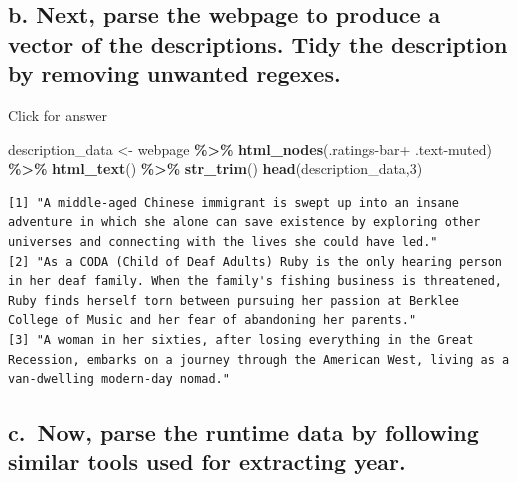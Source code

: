 \documentclass[
]{book}
\newenvironment{Shaded}{\begin{snugshade}}{\end{snugshade}}
\newcommand{\DecValTok}[1]{\textcolor[rgb]{0.00,0.00,0.81}{#1}}
\newcommand{\FunctionTok}[1]{\textcolor[rgb]{0.13,0.29,0.53}{\textbf{#1}}}
\newcommand{\NormalTok}[1]{#1}
\newcommand{\OtherTok}[1]{\textcolor[rgb]{0.56,0.35,0.01}{#1}}
\newcommand{\SpecialCharTok}[1]{\textcolor[rgb]{0.81,0.36,0.00}{\textbf{#1}}}
\newcommand{\StringTok}[1]{\textcolor[rgb]{0.31,0.60,0.02}{#1}}
\begin{document}
\hypertarget{b.-next-parse-the-webpage-to-produce-a-vector-of-the-descriptions.-tidy-the-description-by-removing-unwanted-regexes.}{%
\subsection{b. Next, parse the webpage to produce a vector of the descriptions. Tidy the description by removing unwanted regexes.}\label{b.-next-parse-the-webpage-to-produce-a-vector-of-the-descriptions.-tidy-the-description-by-removing-unwanted-regexes.}}

Click for answer

\begin{Shaded}
\begin{Highlighting}[]
\NormalTok{description\_data }\OtherTok{\textless{}{-}}\NormalTok{ webpage }\SpecialCharTok{\%\textgreater{}\%} 
  \FunctionTok{html\_nodes}\NormalTok{(}\StringTok{\textquotesingle{}.ratings{-}bar+ .text{-}muted\textquotesingle{}}\NormalTok{) }\SpecialCharTok{\%\textgreater{}\%} 
  \FunctionTok{html\_text}\NormalTok{() }\SpecialCharTok{\%\textgreater{}\%} 
  \FunctionTok{str\_trim}\NormalTok{()}
\FunctionTok{head}\NormalTok{(description\_data,}\DecValTok{3}\NormalTok{)}
\end{Highlighting}
\end{Shaded}

\begin{verbatim}
[1] "A middle-aged Chinese immigrant is swept up into an insane adventure in which she alone can save existence by exploring other universes and connecting with the lives she could have led."                                                                      
[2] "As a CODA (Child of Deaf Adults) Ruby is the only hearing person in her deaf family. When the family's fishing business is threatened, Ruby finds herself torn between pursuing her passion at Berklee College of Music and her fear of abandoning her parents."
[3] "A woman in her sixties, after losing everything in the Great Recession, embarks on a journey through the American West, living as a van-dwelling modern-day nomad."                                                                                             
\end{verbatim}

\hypertarget{c.-now-parse-the-runtime-data-by-following-similar-tools-used-for-extracting-year.}{%
\subsection{c.~Now, parse the runtime data by following similar tools used for extracting year.}\label{c.-now-parse-the-runtime-data-by-following-similar-tools-used-for-extracting-year.}}
\end{document}
